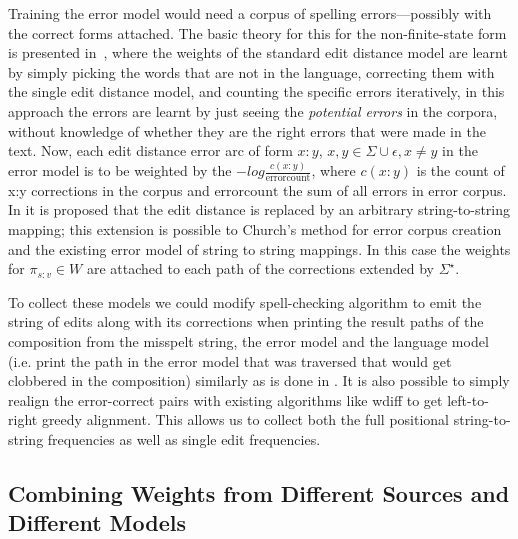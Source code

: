 \documentclass[a4paper,12pt]{article}
\begin{document}
Training the error model would need a corpus of spelling
errors---possibly with the correct forms attached. The basic theory for this
for the non-finite-state form is presented in~\cite{church1991probability},
where the weights of the standard edit distance model are learnt by simply
picking the words that are not in the language, correcting them with the single
edit distance model, and counting the specific errors iteratively, in this
approach the errors are learnt by just seeing the \emph{potential errors} in
the corpora, without knowledge of whether they are the right errors that were
made in the text.  Now, each edit distance error arc of form $x:y$, $x, y \in
\Sigma \cup {\epsilon}, x \neq y$ in the error model is to be weighted by the $-log
\frac{c(x:y)}{\mathrm{error count}}$, where $c(x:y)$ is the count of x:y
corrections in the corpus and $\mathrm{error count}$ the sum of all errors in
error corpus. In \cite{brill2000improved} it is proposed that the
edit distance is replaced by an arbitrary string-to-string mapping; this
extension is possible to Church's method for error corpus creation and
the existing error model of string to string mappings. In this case the
weights for $\pi_{s:v} \in W$ are attached to each path of the corrections
extended by $\Sigma^{\star}$. 

To collect these models we could modify spell-checking algorithm to emit the
string of edits along with its corrections when printing the result paths of
the composition from the misspelt string, the error model and the language
model (i.e. print the path in the error model that was traversed that would get
clobbered in the composition) similarly as is done in
\cite{ristad1998learning}. It is also possible to simply realign the
error-correct pairs with existing algorithms like wdiff to get left-to-right
greedy alignment. This allows us to collect both the full positional
string-to-string frequencies as well as single edit frequencies.

\subsection{Combining Weights from Different Sources and Different Models}
\label{subsec:combining-weights}
\end{document}
